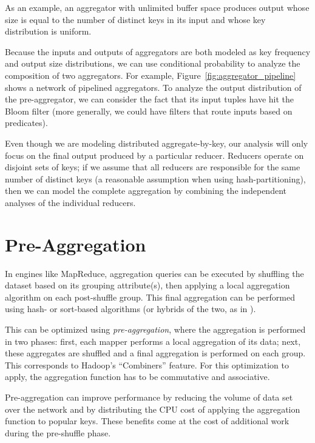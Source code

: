 \documentclass[twocolumn, 10pt]{article}
\begin{document}
As an example, an aggregator with unlimited buffer space produces output whose
size is equal to the number of distinct keys in its input and whose key
distribution is uniform.

Because the inputs and outputs of aggregators are both modeled as key
frequency and output size distributions, we can use conditional probability to
analyze the composition of two aggregators.  For example,
Figure~\ref{fig:aggregator_pipeline} shows a network of pipelined aggregators.
To analyze the output distribution of the pre-aggregator, we can consider the
fact that its input tuples have hit the Bloom filter (more generally, we could
have filters that route inputs based on predicates).

Even though we are modeling distributed aggregate-by-key, our analysis will
only focus on the final output produced by a particular reducer.  Reducers
operate on disjoint sets of keys; if we assume that all reducers are
responsible for the same number of distinct keys (a reasonable assumption when
using hash-partitioning), then we can model the complete aggregation
by combining the independent analyses of the individual reducers.

\section{Pre-Aggregation}

In engines like MapReduce, aggregation queries can be executed by
shuffling the dataset based on its grouping attribute(s), then applying a local
aggregation algorithm on each post-shuffle group.
This final aggregation can be performed using hash- or sort-based algorithms
(or hybrids of the two, as in \cite{aggregation-revisited}).

This can be optimized using \emph{pre-aggregation}, where the aggregation is
performed in two phases: first, each mapper performs a local aggregation
of its data; next, these aggregates are shuffled and a final aggregation is
performed on each group.
This corresponds to Hadoop's ``Combiners'' feature.
For this optimization to apply, the aggregation function has to be commutative
and associative.

Pre-aggregation can improve performance by reducing the volume of data set
over the network and by distributing the CPU cost of applying the aggregation
function to popular keys.
These benefits come at the cost of additional work during the pre-shuffle phase.
\end{document}
